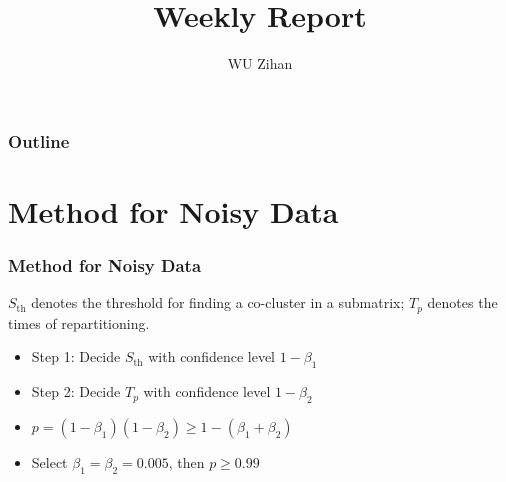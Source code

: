 \documentclass{beamer}
\title{Weekly Report}
\author{WU Zihan}
\begin{document}
\maketitle
\begin{frame}
    \frametitle{Outline}
    \tableofcontents
\end{frame}

\section{Method for Noisy Data}
\begin{frame}
    \frametitle{Method for Noisy Data}
    $S_{\text{th}}$ denotes the threshold for finding a co-cluster in a submatrix;
    $T_p$ denotes the times of repartitioning.
    \begin{itemize}
        \item Step 1: Decide $S_{\text{th}}$ with confidence level $1 - \beta_1$
        \item Step 2: Decide $T_p$ with confidence level $1 - \beta_2$
        \item $p = (1 - \beta_1)(1 - \beta_2) \ge 1 - (\beta_1 + \beta_2)$
        \item Select $\beta_1 = \beta_2 = 0.005$, then $p \ge 0.99$
    \end{itemize}
\end{frame}
\end{document}
